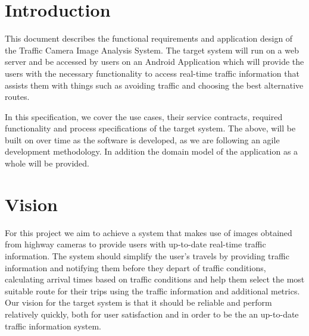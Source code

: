 \documentclass[a4paper,12pt]{article}
\begin{document}
\newpage
\tableofcontents
\newpage

\newpage

\newpage

\section{Introduction}
This document describes the functional requirements and application design of the Traffic Camera Image Analysis System. The target system will run on a web server  and be accessed by users on an Android Application which will provide the users with the necessary functionality to access real-time traffic information that assists them with things such as avoiding traffic and choosing the best alternative routes. 

In this specification, we cover the use cases, their service contracts, required functionality and process specifications of the target system. The above, will be built on over time as the software is developed, as we are following an agile development methodology. In addition the domain model of the application as a whole will be provided.
\section{Vision}
For this project we aim to achieve a system that makes use of images obtained from highway cameras to provide users with up-to-date real-time traffic information. The system should simplify the user's travels by providing traffic information and notifying them before they depart of traffic conditions, calculating arrival times based on traffic conditions and help them select the most suitable route for their trips using the traffic information and additional metrics. Our vision for the target system is that it should be reliable and perform relatively quickly, both for user satisfaction and in order to be the an up-to-date traffic information system.
\end{document}
